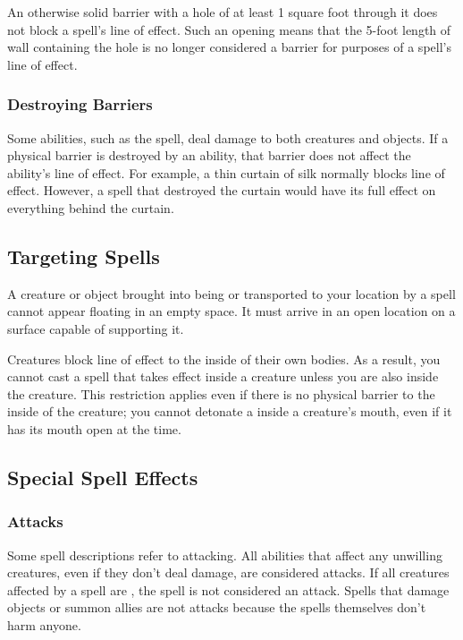         An otherwise solid barrier with a hole of at least 1 square foot through it does not block a spell's line of effect. Such an opening means that the 5-foot length of wall containing the hole is no longer considered a barrier for purposes of a spell's line of effect.

        \subsubsection{Destroying Barriers}\label{Destroying Barriers}
            Some abilities, such as the  spell, deal damage to both creatures and objects.
            If a physical barrier is destroyed by an ability, that barrier does not affect the ability's line of effect.
            For example, a thin curtain of silk normally blocks line of effect.
            However, a spell that destroyed the curtain would have its full effect on everything behind the curtain.

    \subsection{Targeting Spells}

         A creature or object brought into being or transported to your location by a spell cannot appear floating in an empty space. It must arrive in an open location on a surface capable of supporting it.

         Creatures block line of effect to the inside of their own bodies. As a result, you cannot cast a spell that takes effect inside a creature unless you are also inside the creature. This restriction applies even if there is no physical barrier to the inside of the creature; you cannot detonate a  inside a creature's mouth, even if it has its mouth open at the time.

    \subsection{Special Spell Effects}

        \subsubsection{Attacks}
            Some spell descriptions refer to attacking. All abilities that affect any unwilling creatures, even if they don't deal damage, are considered attacks. If all creatures affected by a spell are , the spell is not considered an attack. Spells that damage objects or summon allies are not attacks because the spells themselves don't harm anyone.

